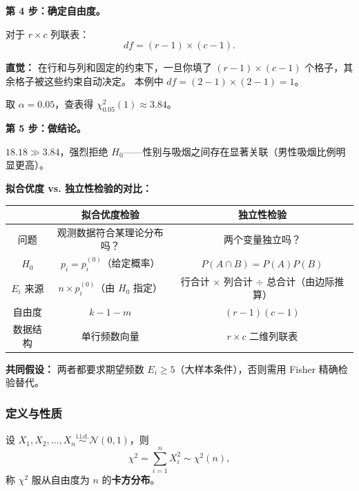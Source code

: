 \textbf{第 4 步：确定自由度。}

对于 $r \times c$ 列联表：
\begin{equation}
    df = (r - 1) \times (c - 1).
\end{equation}

\textbf{直觉：} 在行和与列和固定的约束下，一旦你填了 $(r-1) \times (c-1)$ 个格子，其余格子被这些约束自动决定。
本例中 $df = (2-1) \times (2-1) = 1$。

取 $\alpha = 0.05$，查表得 $\chi^2_{0.05}(1) \approx 3.84$。

\textbf{第 5 步：做结论。}

$18.18 \gg 3.84$，强烈拒绝 $H_0$——性别与吸烟之间存在显著关联（男性吸烟比例明显更高）。

\medskip
\textbf{拟合优度 vs. 独立性检验的对比：}

\begin{center}
\renewcommand{\arraystretch}{1.3}
\begin{tabular}{c|c|c}
\toprule
& \textbf{拟合优度检验} & \textbf{独立性检验} \\
\midrule
问题 & 观测数据符合某理论分布吗？ & 两个变量独立吗？ \\
$H_0$ & $p_i = p_i^{(0)}$（给定概率） & $P(A \cap B) = P(A)P(B)$ \\
$E_i$ 来源 & $n \times p_i^{(0)}$（由 $H_0$ 指定） & 行合计 $\times$ 列合计 $\div$ 总合计（由边际推算） \\
自由度 & $k - 1 - m$ & $(r-1)(c-1)$ \\
数据结构 & 单行频数向量 & $r \times c$ 二维列联表 \\
\bottomrule
\end{tabular}
\end{center}

\textbf{共同假设：} 两者都要求期望频数 $E_i \ge 5$（大样本条件），否则需用 Fisher 精确检验替代。

\subsubsection{定义与性质}

\begin{definition}[$\chi^2$ 分布]
设 $X_1, X_2, \dots, X_n \stackrel{\mathrm{i.i.d.}}{\sim} \mathcal{N}(0,1)$，则
\begin{equation}
    \chi^2 = \sum_{i=1}^{n} X_i^2 \sim \chi^2(n),
\end{equation}
称 $\chi^2$ 服从自由度为 $n$ 的\textbf{卡方分布}。
\end{definition}

